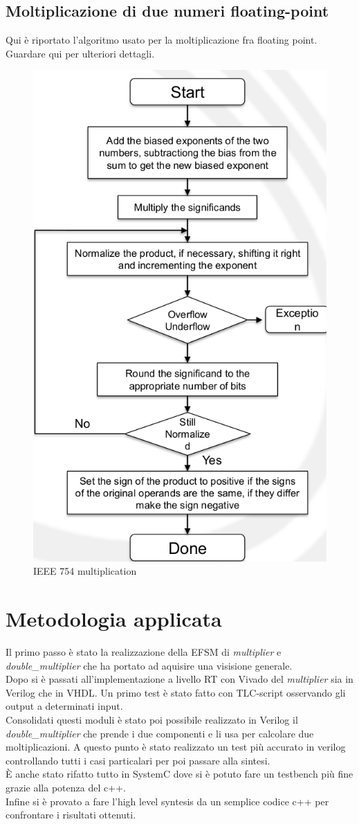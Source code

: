 \documentclass[]{IEEEtran}
\begin{document}
\subsection{Moltiplicazione di due numeri floating-point}
Qui è riportato l'algoritmo usato per la moltiplicazione fra floating point. Guardare qui per ulteriori dettagli\cite{IEEE754Mult}.
\begin{figure}[!htb]
    \centering
    \includegraphics[width=0.6\linewidth]{figures/ieee_multiplication.png}
    \caption{IEEE 754 multiplication}
    \label{fig:IEEE_multiplication}
\end{figure}



\section{Metodologia applicata}
Il primo passo è stato la realizzazione della EFSM di \textit{multiplier} e \textit{double\_multiplier} che ha portato ad aquisire una visisione generale.
\\Dopo si è passati all'implementazione a livello RT con Vivado\cite{Vivado} del \textit{multiplier} sia in Verilog che in VHDL. Un primo test è stato fatto con TLC-script osservando gli output a determinati input.
\\Consolidati questi moduli è stato poi possibile realizzato in Verilog il \textit{double\_multiplier} che prende i due componenti e li usa per calcolare due moltiplicazioni. A questo punto è stato realizzato un test più accurato in verilog controllando tutti i casi particalari per poi passare alla sintesi.
\\È anche stato rifatto tutto in SystemC dove si è potuto fare un testbench più fine grazie alla potenza del c++.
\\Infine si è provato a fare l'high level syntesis da un semplice codice c++ per confrontare i risultati ottenuti.
\end{document}
